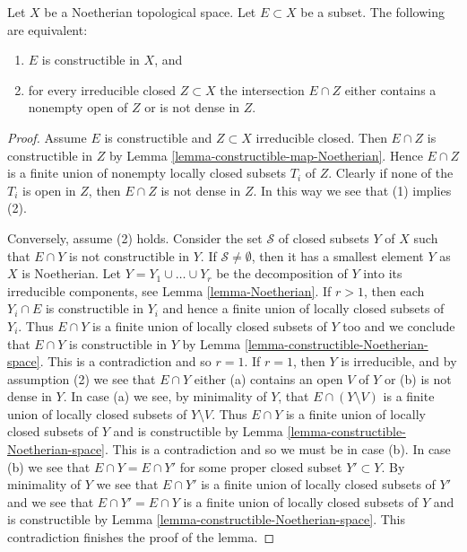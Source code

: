 \begin{lemma}
\label{lemma-characterize-constructible-Noetherian}
Let $X$ be a Noetherian topological space.
Let $E \subset X$ be a subset.
The following are equivalent:
\begin{enumerate}
\item $E$ is constructible in $X$, and
\item for every irreducible closed $Z \subset X$ the intersection
$E \cap Z$ either contains a nonempty open of $Z$ or is not dense in $Z$.
\end{enumerate}
\end{lemma}

\begin{proof}
Assume $E$ is constructible and $Z \subset X$ irreducible closed.
Then $E \cap Z$ is constructible in $Z$ by
Lemma \ref{lemma-constructible-map-Noetherian}.
Hence $E \cap Z$ is a finite union of nonempty locally closed subsets
$T_i$ of $Z$. Clearly if none of the $T_i$ is open in $Z$, then
$E \cap Z$ is not dense in $Z$. In this way we see that (1) implies (2).

\medskip\noindent
Conversely, assume (2) holds. Consider the set $\mathcal{S}$ of closed
subsets $Y$ of $X$ such that $E \cap Y$ is not constructible in $Y$.
If $\mathcal{S} \not = \emptyset$, then it has a smallest element $Y$
as $X$ is Noetherian.
Let $Y = Y_1 \cup \ldots \cup Y_r$ be the decomposition of $Y$ into its
irreducible components, see
Lemma \ref{lemma-Noetherian}.
If $r > 1$, then each $Y_i \cap E$ is constructible in $Y_i$ and hence
a finite union of locally closed subsets of $Y_i$. Thus $E \cap Y$
is a finite union of locally closed subsets of $Y$ too and we conclude
that $E \cap Y$ is constructible in $Y$ by
Lemma \ref{lemma-constructible-Noetherian-space}.
This is a contradiction and so $r = 1$. If $r = 1$, then $Y$ is
irreducible, and by assumption (2) we see that $E \cap Y$ either
(a) contains an open $V$ of $Y$ or (b) is not dense in $Y$.
In case (a) we see, by minimality of $Y$, that $E \cap (Y \setminus V)$
is a finite union of locally closed subsets of $Y \setminus V$. Thus
$E \cap Y$ is a finite union of locally closed subsets of $Y$ and is
constructible by
Lemma \ref{lemma-constructible-Noetherian-space}.
This is a contradiction and so we must be in case (b).
In case (b) we see that $E \cap Y = E \cap Y'$ for some proper closed
subset $Y' \subset Y$. By minimality of $Y$ we see that
$E \cap Y'$ is a finite union of locally closed subsets of $Y'$ and
we see that $E \cap Y' = E \cap Y$ is a finite union of locally closed
subsets of $Y$ and is constructible by
Lemma \ref{lemma-constructible-Noetherian-space}.
This contradiction finishes the proof of the lemma.
\end{proof}

